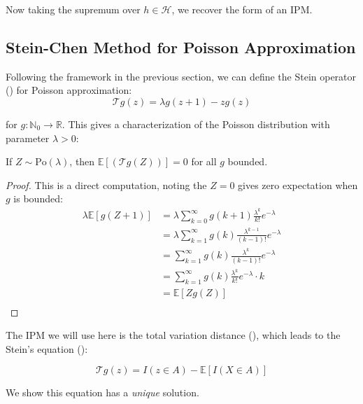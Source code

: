 \documentclass{article}
\begin{document}
Now taking the supremum over $h \in \mathcal{H}$, we recover the form of an IPM. 



\subsection{Stein-Chen Method for Poisson Approximation}  
Following the framework in the previous section, we can define the Stein operator () for Poisson approximation:
\begin{equation}
    \mathcal{T}g(z) = \lambda g(z+1) - zg(z)
\end{equation}

for $g: \mathbb{N}_0 \to \mathbb{R}$. This gives a characterization of the Poisson distribution with parameter $\lambda>0$:

\begin{proposition}
    \label{prop: direction1 poisson}
    If $Z\sim \text{Po}(\lambda)$, then $\mathbb{E}[(\mathcal{T}g(Z))]=0$ for all $g$ bounded.
\end{proposition}

\begin{proof}
This is a direct computation, noting the $Z=0$ gives zero expectation when $g$ is bounded:  
    \begin{align*}
        \lambda \mathbb{E}[g(Z+1)] &= \lambda \sum_{k=0}^\infty g(k+1) \frac{\lambda^k}{k!} e^{-\lambda}\\
        &= \lambda \sum_{k=1}^\infty g(k) \frac{\lambda^{k-1}}{(k-1)!} e^{-\lambda}\\
        &= \sum_{k=1}^\infty g(k) \frac{\lambda^k}{(k-1)!} e^{-\lambda}\\
        &= \sum_{k=1}^\infty g(k) \frac{\lambda^k}{k!} e^{-\lambda} \cdot k\\
        &= \mathbb{E}[Zg(Z)]\\
    \end{align*}
\end{proof}


The IPM we will use here is the total variation distance (), which leads to the Stein's equation ():

\begin{equation}
    \mathcal{T}g(z) = I(z \in A) - \mathbb{E}[I(X \in A)]
    \label{eq:poisson_stein_equation}
\end{equation}

We show this equation has a \textit{unique} solution.
\end{document}
